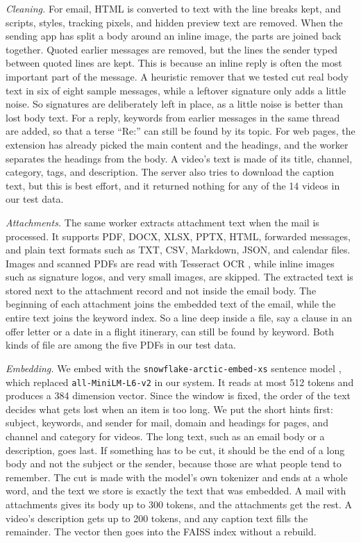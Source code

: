 \documentclass[conference]{IEEEtran}
\newcommand{\embmodel}{\texttt{snowflake\allowbreak-arctic\allowbreak-embed\allowbreak-xs}}
\begin{document}
\textit{Cleaning.} For email, HTML is converted to text with the line breaks kept, and scripts, styles, tracking pixels, and hidden preview text are removed. When the sending app has split a body around an inline image, the parts are joined back together. Quoted earlier messages are removed, but the lines the sender typed between quoted lines are kept. This is because an inline reply is often the most important part of the message. A heuristic remover that we tested cut real body text in six of eight sample messages, while a leftover signature only adds a little noise. So signatures are deliberately left in place, as a little noise is better than lost body text. For a reply, keywords from earlier messages in the same thread are added, so that a terse ``Re:'' can still be found by its topic. For web pages, the extension has already picked the main content and the headings, and the worker separates the headings from the body. A video's text is made of its title, channel, category, tags, and description. The server also tries to download the caption text, but this is best effort, and it returned nothing for any of the 14 videos in our test data.

\textit{Attachments.} The same worker extracts attachment text when the mail is processed. It supports PDF, DOCX, XLSX, PPTX, HTML, forwarded messages, and plain text formats such as TXT, CSV, Markdown, JSON, and calendar files. Images and scanned PDFs are read with Tesseract OCR \cite{b15}, while inline images such as signature logos, and very small images, are skipped. The extracted text is stored next to the attachment record and not inside the email body. The beginning of each attachment joins the embedded text of the email, while the entire text joins the keyword index. So a line deep inside a file, say a clause in an offer letter or a date in a flight itinerary, can still be found by keyword. Both kinds of file are among the five PDFs in our test data.

\textit{Embedding.} We embed with the \embmodel{} sentence model \cite{b16}, which replaced \texttt{all-\allowbreak MiniLM-\allowbreak L6-\allowbreak v2} in our system. It reads at most 512 tokens and produces a 384 dimension vector. Since the window is fixed, the order of the text decides what gets lost when an item is too long. We put the short hints first: subject, keywords, and sender for mail, domain and headings for pages, and channel and category for videos. The long text, such as an email body or a description, goes last. If something has to be cut, it should be the end of a long body and not the subject or the sender, because those are what people tend to remember. The cut is made with the model's own tokenizer and ends at a whole word, and the text we store is exactly the text that was embedded. A mail with attachments gives its body up to 300 tokens, and the attachments get the rest. A video's description gets up to 200 tokens, and any caption text fills the remainder. The vector then goes into the FAISS index without a rebuild.
\end{document}
